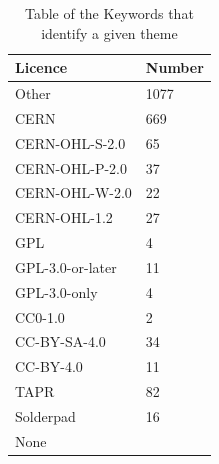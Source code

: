 \documentclass[final-report.tex]{subfiles}
\begin{document}
\begin{table}[ht]
    \centering
    \begin{tabularx}{\columnwidth}{| X | X |}
    \toprule
            Licence & Number \\
    \midrule
        Other & 1077 \\
        CERN & 669 \\
        CERN-OHL-S-2.0 & 65 \\
        CERN-OHL-P-2.0 & 37 \\
        CERN-OHL-W-2.0 & 22 \\
        CERN-OHL-1.2 & 27 \\
        GPL & 4 \\
        GPL-3.0-or-later & 11 \\
        GPL-3.0-only & 4 \\
        CC0-1.0 & 2 \\
        CC-BY-SA-4.0 & 34 \\
        CC-BY-4.0 & 11 \\
        TAPR & 82 \\
        Solderpad & 16 \\
        None &  \\
    \bottomrule
    \end{tabularx}
    \caption{Table of the Keywords that identify a given theme}
    \label{tab:keywords}
\end{table}
\end{document}
